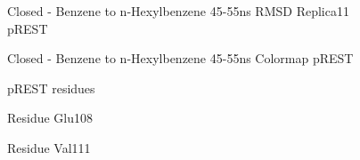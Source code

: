 \documentclass[T4paper.tex]{subfiles}
\begin{document}
\begin{figure}[!ht]
   \caption{Closed - Benzene to n-Hexylbenzene 45-55ns RMSD Replica11 pREST}
   \label{fig:c_opls3_rest1_1/45-55ns/RMSD-replica11}
\end{figure}

\begin{figure}[!ht]
   \caption{Closed - Benzene to n-Hexylbenzene 45-55ns Colormap pREST}
   \label{fig:c_opls3_rest1_1/cmap-45-55ns}
\end{figure}

\begin{figure}[!ht]
   \caption{pREST residues}
   \label{fig:C2O}
\end{figure}

\begin{figure}[!ht]
   \caption{Residue Glu108}
   \label{fig:Glu108-C2O}
\end{figure}

\begin{figure}[!ht]
   \caption{Residue Val111}
   \label{fig:Val111-C2O}
\end{figure}
\end{document}
